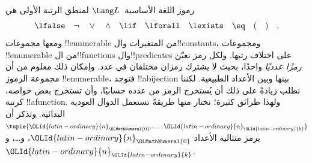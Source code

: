 \documentclass[../../../include/open-logic-section]{subfiles}
\begin{document}

رموز اللغة الأساسية~$\Lang L$ لمنطق الرتبة الأولى هي
\[
\lfalse \quad \lnot \quad \lor \quad \land \quad \lif \quad \lforall
\quad \lexists \quad \eq \quad ( \quad ) \quad ,
\]
ومعها مجموعات !!{enumerable} من المتغيرات
وال!!{constant}s، ومجموعات !!{enumerable}
من ال!!{function}s وال!!{predicate}s على
اختلاف رتبها. ولكل رمز نعيّن \emph{رمزًا عدديًا}
واحدًا، بحيث لا يشترك رمزان مختلفان في عدد.
وإمكان ذلك معلوم من أن مجموعة الرموز
!!{enumerable}، فتوجد !!a{bijection} بينها
وبين الأعداد الطبيعية. لكننا نطلب زيادةً
على ذلك أن يُستخرج الرمز من عدده حسابيًا،
وأن تستخرج بعض خواصه، كرتبة !!a{function}.
ولهذا طرائق كثيرة؛ نختار منها طريقةً
تستعمل الدوال العودية البدائية.
وتذكر أن $\tuple{\OLId{latin-ordinary}{n}_\OLMathNumeral{0},\dots,\OLId{latin-ordinary}{n}_\OLId{latin-ordinary}{k}}$ يرمز
متتالية الأعداد $\OLId{latin-ordinary}{n}_\OLMathNumeral{0}$، و\dots، و$\OLId{latin-ordinary}{n}_\OLId{latin-ordinary}{k}$.
\end{document}
